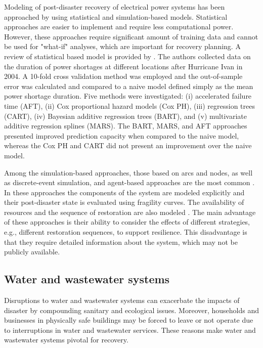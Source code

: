 Modeling of post-disaster recovery of electrical power systems has been approached by using statistical and simulation-based models. Statistical approaches are easier to implement and require less computational power. However, these approaches require significant amount of training data and cannot be used for "what-if" analyses, which are important for recovery planning. A review of statistical based model is provided by \cite{liu2007statistical}. The authors collected data on the duration of power shortages at different locations after Hurricane Ivan in 2004. A 10-fold cross validation method was employed and the out-of-sample error was calculated and compared to a naive model defined simply as the mean power shortage duration. Five methods were investigated: (i) accelerated failure time (AFT), (ii) Cox proportional hazard models (Cox PH), (iii) regression trees (CART), (iv) Bayesian additive regression trees (BART), and (v) multivariate additive regression splines (MARS). The BART, MARS, and AFT approaches presented improved prediction capacity when compared to the naive model, whereas the Cox PH and CART did not present an improvement over the naive model. \ 

Among the simulation-based approaches, those based on arcs and nodes, as well as discrete-event simulation, and agent-based approaches are the most common \citep{Eusgeld2008a,ouyang2014review,sun2019resilience}. In these approaches the components of the system are modeled explicitly and their post-disaster state is evaluated using fragility curves. The availability of resources and the sequence of restoration are also modeled \citep{ouyang2014multi}. The main advantage of these approaches is their ability to consider the effects of different strategies, e.g., different restoration sequences, to support resilience. This disadvantage is that they require detailed information about the system, which may not be publicly available. \ 

\subsection{Water and wastewater systems}
Disruptions to water and wastewater systems can exacerbate the impacts of disaster by compounding sanitary and ecological issues. Moreover, households and businesses in physically safe buildings may be forced to leave or not operate due to interruptions in water and wastewater services. These reasons make water and wastewater systems pivotal for recovery.\

